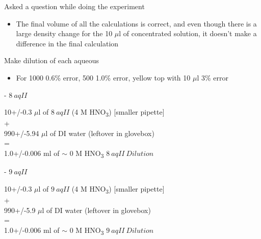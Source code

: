 \documentclass[idxtotoc,hyperref,openany,oneside]{labbook} %
\newcommand{\cmark}{\ding{51}}%
\newcommand{\done}{\rlap{$\square$}{\raisebox{2pt}{\large\hspace{1pt}\cmark}}%
  \hspace{-2.5pt}}
\newcommand{\tsbs}{\textsubscript}
\begin{document}



\begin{todolist}
\item[\done]{Asked a question while doing the experiment}
  \begin{itemize}
  \item{The final volume of all the calculations is correct,
    and even though there is a large density change for the 10
    $\mu$l of concentrated solution, it doesn't make a difference
    in the final calculation}
  \end{itemize}
\item[\done]{Make dilution of each aqueous}
  \begin{itemize}
  \item{For 1000 0.6\% error, 500 1.0\% error, yellow top with
    10 $\mu$l 3\% error}
  \end{itemize}
\begin{todolist}
\item[\done]{- $\boxed{8\ aqII}$}
\end{todolist}
\begin{center}
10+/-0.3 $\mu$l of $\boxed{8\ aqII}$ (4 M HNO\tsbs{3}) [smaller pipette]\\
+\\
990+/-5.94 $\mu$l of DI water (leftover in glovebox)\\
=\\
1.0+/-0.006 ml of $\sim$ 0 M HNO\tsbs{3} $\boxed{8\ aqII\ Dilution}$
\end{center}

\begin{todolist}
\item[\done]{- $\boxed{9\ aqII}$}
\end{todolist}
\begin{center}
10+/-0.3 $\mu$l of $\boxed{9\ aqII}$ (4 M HNO\tsbs{3}) [smaller pipette]\\
+\\
990+/-5.9 $\mu$l of DI water (leftover in glovebox)\\
=\\
1.0+/-0.006 ml of $\sim$ 0 M HNO\tsbs{3} $\boxed{9\ aqII\ Dilution}$
\end{center}


\end{todolist}
\end{document}
